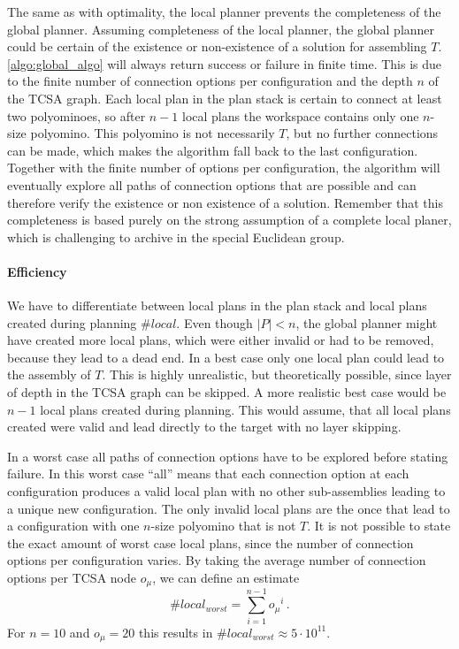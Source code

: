 The same as with optimality, the local planner prevents the completeness of the global planner.
Assuming completeness of the local planner, the global planner could be certain of the existence or non-existence of a solution for assembling $T$.
\autoref{algo:global_algo} will always return success or failure in finite time.
This is due to the finite number of connection options per configuration and the depth $n$ of the TCSA graph.
Each local plan in the plan stack is certain to connect at least two polyominoes, so after $n-1$ local plans the workspace contains only one $n$-size polyomino.
This polyomino is not necessarily $T$, but no further connections can be made, which makes the algorithm fall back to the last configuration.
Together with the finite number of options per configuration, the algorithm will eventually explore all paths of connection options that are possible and can therefore verify the existence or non existence of a solution.
Remember that this completeness is based purely on the strong assumption of a complete local planer, which is challenging to archive in the special Euclidean group.

\paragraph{Efficiency}

We have to differentiate between local plans in the plan stack and local plans created during planning $\#local$.
Even though $|P| < n$, the global planner might have created more local plans, which were either invalid or had to be removed, because they lead to a dead end.
In a best case only one local plan could lead to the assembly of $T$.
This is highly unrealistic, but theoretically possible, since layer of depth in the TCSA graph can be skipped.
A more realistic best case would be $n-1$ local plans created during planning. 
This would assume, that all local plans created were valid and lead directly to the target with no layer skipping.

In a worst case all paths of connection options have to be explored before stating failure.
In this worst case ``all'' means that each connection option at each configuration produces a valid local plan with no other sub-assemblies leading to a unique new configuration.
The only invalid local plans are the once that lead to a configuration with one $n$-size polyomino that is not $T$.
It is not possible to state the exact amount of worst case local plans, since the number of connection options per configuration varies.
By taking the average number of connection options per TCSA node $o_\mu$, we can define an estimate
\begin{equation}
\#local_{worst} = \sum_{i=1}^{n-1} {o_\mu}^i \, .
\end{equation} 
For $n = 10$ and $o_\mu = 20$ this results in $\#local_{worst} \approx 5 \cdot 10^{11}$.

